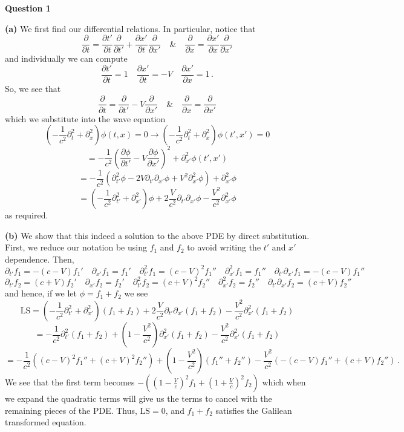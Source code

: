 \documentclass[10pt]{article}
\newcommand{\di}[2][]{\frac{\partial #1}{\partial #2}}
\begin{document}
\textbf{Question 1}

\textbf{(a)} We first find our differential relations. In particular, notice that
\[ \di{t} = \di[t']{t}\di{t'} + \di[x']{t}\di{x'} \quad \& \quad \di{x} = \di[x']{x}\di{x'} \]
and individually we can compute
\[ \di[t']{t} = 1 \quad \di[x']{t} = -V \quad \di[x']{x} = 1 \, .\]
So, we see that
\[ \di{t} = \di{t'} - V\di{x'} \quad \& \quad \di{x} = \di{x'} \]
which we substitute into the wave equation
\[\left( -\frac{1}{c^{2}}\partial_{t}^{2} + \partial_{x}^{2}\right)\phi(t,x) = 0 \to \left( -\frac{1}{c^{2}}\partial_{t}^{2} + \partial_{x}^{2}\right)\phi(t',x') = 0\]
\[ = -\frac{1}{c^{2}}\left(\di[\phi]{t'} - V\di[\phi]{x'}\right)^{2} + \partial_{x'}^{2}\phi(t',x') \]
\[ = -\frac{1}{c^{2}}\left(\partial_{t'}^{2}\phi - 2V\partial_{t'}\partial_{x'}\phi + V^{2}\partial_{x'}^{2}\phi\right) + \partial_{x'}^{2}\phi \]
\[  =\left(-\frac{1}{c^{2}}\partial_{t'}^{2} + \partial_{x'}^{2}\right)\phi + 2\frac{V}{c^{2}}\partial_{t'}\partial_{x'}\phi - \frac{V^{2}}{c^{2}}\partial_{x'}^{2}\phi \]
as required.

\textbf{(b)} We show that this indeed a solution to the above PDE by direct substitution. First, we reduce our notation be using $f_{1}$ and $f_{2}$ to avoid writing the $t'$ and $x'$ dependence. Then,
\[ \partial_{t'}f_{1} = -(c-V)f_{1}' \quad \partial_{x'}f_{1} = f_{1}' \quad \partial_{t'}^{2}f_{1} = (c-V)^{2}f_{1}'' \quad \partial_{x'}^{2}f_{1} = f_{1}'' \quad \partial_{t'}\partial_{x'}f_{1} = -(c-V)f_{1}'' \]
\[ \partial_{t'}f_{2} = (c+V)f_{2}' \quad \partial_{x'}f_{2} = f_{2}' \quad \partial_{t'}^{2}f_{2} = (c+V)^{2}f_{2}'' \quad \partial_{x'}^{2}f_{2} = f_{2}'' \quad \partial_{t'}\partial_{x'}f_{2} = (c+V)f_{2}'' \]
and hence, if we let $\phi = f_{1} + f_{2}$ we see
\[ \text{LS} = \left(-\frac{1}{c^{2}}\partial_{t'}^{2} + \partial_{x'}^{2}\right)(f_{1} + f_{2}) + 2\frac{V}{c^{2}}\partial_{t'}\partial_{x'}(f_{1} +f_{2}) - \frac{V^{2}}{c^{2}}\partial_{x'}^{2}(f_{1} + f_{2}) \]
\[ = -\frac{1}{c^{2}}\partial_{t'}^{2}(f_{1} + f_{2}) + \left(1 - \frac{V^{2}}{c^{2}}\right)\partial_{x'}^{2}(f_{1} + f_{2}) - \frac{V^{2}}{c^{2}}\partial_{x'}^{2}(f_{1} + f_{2}) \]
\[ = -\frac{1}{c^{2}}((c-V)^{2}f_{1}'' + (c+V)^{2}f_{2}'') + \left(1 - \frac{V^{2}}{c^{2}}\right)(f_{1}'' + f_{2}'') - \frac{V^{2}}{c^{2}}(-(c-V)f_{1}'' + (c+V)f_{2}'') \, .\]
We see that the first term becomes $-((1 - \frac{V}{c})^{2}f_{1} + (1 + \frac{V}{c})^{2}f_{2})$ which when we expand the quadratic terms will give us the terms to cancel with the remaining pieces of the PDE. Thus, $\text{LS} = 0$, and $f_{1} + f_{2}$ satisfies the Galilean transformed equation.
\end{document}
